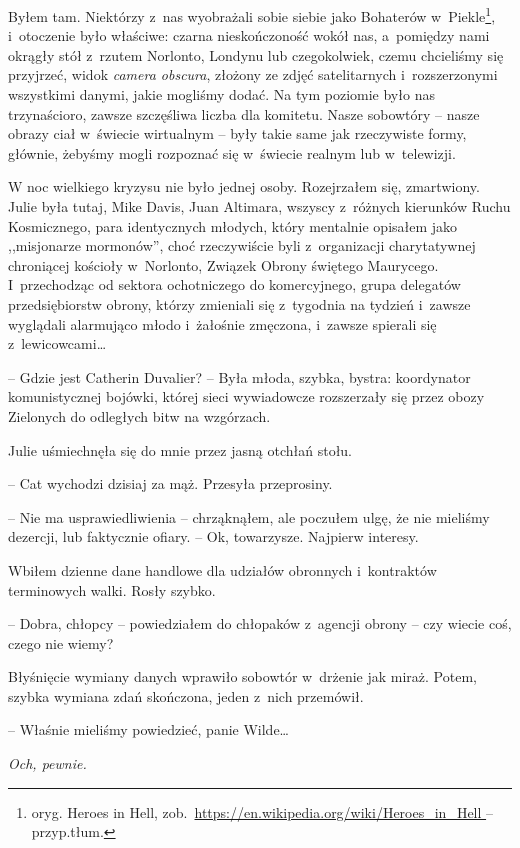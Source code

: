 \documentclass[oneside,polish,11pt,sfheadings]{mwbk}
\begin{document}
Byłem tam. Niektórzy z~nas wyobrażali sobie siebie jako Bohaterów w~Piekle\footnote{oryg. Heroes in Hell,
zob.~\url{https://en.wikipedia.org/wiki/Heroes_in_Hell } -- przyp.tłum.}, i~otoczenie było właściwe: czarna nieskończoność wokół
nas, a~pomiędzy nami okrągły stół z~rzutem Norlonto, Londynu lub
czegokolwiek, czemu chcieliśmy się przyjrzeć, widok \emph{camera
obscura}, złożony ze zdjęć satelitarnych i~rozszerzonymi wszystkimi
danymi, jakie mogliśmy dodać. Na tym poziomie było nas trzynaścioro,
zawsze szczęśliwa liczba dla komitetu. Nasze sobowtóry -- nasze obrazy
ciał w~świecie wirtualnym -- były takie same jak rzeczywiste formy,
głównie, żebyśmy mogli rozpoznać się w~świecie realnym lub w~telewizji.

W noc wielkiego kryzysu nie było jednej osoby. Rozejrzałem się,
zmartwiony. Julie była tutaj, Mike Davis, Juan Altimara, wszyscy z~różnych kierunków Ruchu Kosmicznego, para identycznych młodych, który
mentalnie opisałem jako ,,misjonarze mormonów'', choć rzeczywiście byli z~organizacji charytatywnej chroniącej kościoły w~Norlonto, Związek Obrony
świętego Maurycego. I~przechodząc od sektora ochotniczego do
komercyjnego, grupa delegatów przedsiębiorstw obrony, którzy zmieniali
się z~tygodnia na tydzień i~zawsze wyglądali alarmująco młodo i~żałośnie
zmęczona, i~zawsze spierali się z~lewicowcami\ldots

-- Gdzie jest Catherin Duvalier? -- Była młoda, szybka, bystra:
koordynator komunistycznej bojówki, której sieci wywiadowcze rozszerzały
się przez obozy Zielonych do odległych bitw na wzgórzach.

Julie uśmiechnęła się do mnie przez jasną otchłań stołu.

-- Cat wychodzi dzisiaj za mąż. Przesyła przeprosiny.

-- Nie ma usprawiedliwienia -- chrząknąłem, ale poczułem ulgę, że nie
mieliśmy dezercji, lub faktycznie ofiary. -- Ok, towarzysze. Najpierw
interesy.

Wbiłem dzienne dane handlowe dla udziałów obronnych i~kontraktów
terminowych walki. Rosły szybko.

-- Dobra, chłopcy -- powiedziałem do chłopaków z~agencji obrony -- czy
wiecie coś, czego nie wiemy?

Błyśnięcie wymiany danych wprawiło sobowtór w~drżenie jak miraż. Potem,
szybka wymiana zdań skończona, jeden z~nich przemówił.

-- Właśnie mieliśmy powiedzieć, panie Wilde\ldots

\emph{Och, pewnie.}
\end{document}

